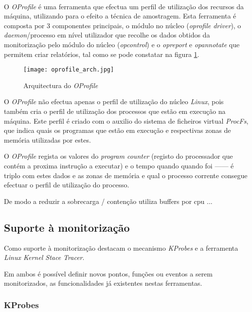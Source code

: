 \paragraph*{}
O \textit{OProfile} é uma ferramenta que efectua um perfil de utilização dos recursos da máquina, utilizando para o efeito a técnica de amostragem.
Esta ferramenta é composta por 3 componentes principais, o módulo no núcleo (\textit{oprofile driver}), o \textit{daemon}/processo em nível utilizador que recolhe os dados obtidos da monitorização pelo módulo do núcleo (\textit{opcontrol}) e o \textit{opreport} e \textit{opannotate} que permitem criar relatórios, tal como se pode constatar na figura \ref{fig:oprofile_arch}.

\begin{figure}[!htb]
       \centering
       \texttt{[image: oprofile\_arch.jpg]}
       \caption{Arquitectura do \textit{OProfile} \cite{Will:TuninProgrOProf}}
	\label{fig:oprofile_arch}
\end{figure}

O \textit{OProfile} não efectua apenas o perfil de utilização do núcleo \textit{Linux}, pois também cria o perfil de utilização dos processos que estão em execução na máquina.
Este perfil é criado com o auxilio do sistema de ficheiros virtual \textit{ProcFs}, que indica quais os programas que estão em execução e respectivas zonas de memória utilizadas por estes.

O \textit{OProfile} regista os valores do \textit{program counter} (registo do processador que contém a proxima instrução a executar) e o tempo quando quando foi  ------ é triplo com estes dados e as zonas de memória e qual o processo corrente consegue efectuar o perfil de utilização do processo.

De modo a reduzir a sobrecarga / contenção utiliza buffers por cpu ... 



\subsection{Suporte à monitorização}

Como suporte à monitorização destacam o mecanismo \textit{KProbes} e a ferramenta \textit{Linux Kernel Stace Tracer}.

Em \todo{} ambos é possível definir novos pontos, funções ou eventos a serem monitorizados, as funcionalidades já existentes nestas ferramentas.

\subsubsection{KProbes}\label{sect:KProbes_overview}

